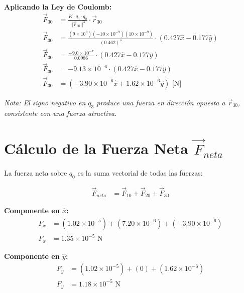 \documentclass[12pt,letterpaper]{article}
\begin{document}
\vspace{0.5cm}
\textbf{Aplicando la Ley de Coulomb:}
\begin{align*}
    \vec{F}_{30} &= \frac{K \cdot q_3 \cdot q_0}{||\vec{r}_{30}||^3} \cdot \vec{r}_{30} \\[0.3cm]
    \vec{F}_{30} &= \frac{(9 \times 10^9)(-10 \times 10^{-9})(10 \times 10^{-9})}{(0.462)^3} \cdot (0.427\hat{x} - 0.177\hat{y}) \\[0.3cm]
    \vec{F}_{30} &= \frac{-9.0 \times 10^{-7}}{0.0986} \cdot (0.427\hat{x} - 0.177\hat{y}) \\[0.3cm]
    \vec{F}_{30} &= -9.13 \times 10^{-6} \cdot (0.427\hat{x} - 0.177\hat{y}) \\[0.3cm]
    \vec{F}_{30} &= \boxed{(-3.90 \times 10^{-6}\hat{x} + 1.62 \times 10^{-6}\hat{y}) \text{ [N]}}
\end{align*}

\textit{Nota: El signo negativo en $q_3$ produce una fuerza en direcci\'on opuesta a $\vec{r}_{30}$, consistente con una fuerza atractiva.}

\section*{C\'alculo de la Fuerza Neta $\vec{F}_{neta}$}

La fuerza neta sobre $q_0$ es la suma vectorial de todas las fuerzas:

\begin{align*}
    \vec{F}_{neta} &= \vec{F}_{10} + \vec{F}_{20} + \vec{F}_{30}
\end{align*}

\textbf{Componente en $\hat{x}$:}
\begin{align*}
    F_x &= (1.02 \times 10^{-5}) + (7.20 \times 10^{-6}) + (-3.90 \times 10^{-6}) \\
    F_x &= 1.35 \times 10^{-5} \text{ N}
\end{align*}

\textbf{Componente en $\hat{y}$:}
\begin{align*}
    F_y &= (1.02 \times 10^{-5}) + (0) + (1.62 \times 10^{-6}) \\
    F_y &= 1.18 \times 10^{-5} \text{ N}
\end{align*}

\begin{center}
\end{center}
\end{document}
